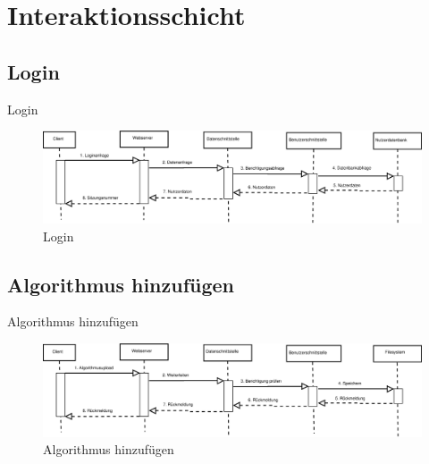 \documentclass{beamer}
\begin{document}
		\section[Interaktion]{Interaktionsschicht}
		\subsection{Login}
		\begin{frame}{Login}	
			\begin{figure}
				\centering
				\includegraphics[width=\linewidth]{../Grafik/Diagramm/Szenarios/Login}
				\caption{Login}
				\label{fig:Login}
			\end{figure}
		\end{frame}
		
		\subsection{Algorithmus hinzufügen}
		\begin{frame}{Algorithmus hinzufügen}	
			\begin{figure}
				\centering
				\includegraphics[width=\linewidth]{../Grafik/Diagramm/Szenarios/Algorithmus}
				\caption{Algorithmus hinzufügen}
				\label{fig:Algorithmus}
			\end{figure}
		\end{frame}
		
\end{document}
